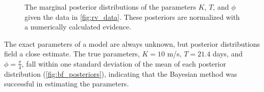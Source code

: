 \documentclass[preprint,longauthor]{aastex631}
\numberwithin{equation}{section}
\begin{document}
\begin{figure}[ht!]
\centering

\hfill
{}
\hfill
{}
\caption{The marginal posterior distributions of the parameters $K$, $T$, and $\phi$ given the data in \autoref{fig:rv_data}. These posteriors are normalized with a numerically calculated evidence.}
\label{fig:bf_posteriors}
\end{figure}

The exact parameters of a model are always unknown, but posterior distributions field a close estimate. The true parameters, $K=10$ m/s, $T=21.4$ days, and $\phi=\frac{\pi}{4}$, fall within one standard deviation of the mean of each posterior distribution (\autoref{fig:bf_posteriors}), indicating that the Bayesian method was successful in estimating the parameters.
\end{document}
